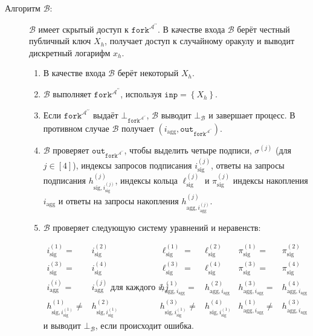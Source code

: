 \documentclass{mrl}
\theoremstyle{definition}
\numberwithin{theorem}{subsection}
\newcommand{\adversary}{\mathcal{A}}
\begin{document}
\begin{description}
\item [Алгоритм $\mathcal{B}$:] $\mathcal{B}$ имеет скрытый доступ к $\texttt{fork}^{\adversary^{\prime \prime}}$. В качестве входа $\mathcal{B}$ берёт честный публичный ключ $X_h$, получает доступ к случайному оракулу и выводит дискретный логарифм $x_h$.

\begin{enumerate}
\item В качестве входа $\mathcal{B}$ берёт некоторый $X_h$.

\item $\mathcal{B}$ выполняет $\texttt{fork}^{\adversary^{\prime \prime}}$, используя $\texttt{inp} = \left\{X_h\right\}$.

\item Если $\texttt{fork}^{\adversary^{\prime \prime}}$ выдаёт $\bot_{\texttt{fork}^{\adversary^{\prime \prime}}}$, $\mathcal{B}$ выводит $\bot_{\mathcal{B}}$ и завершает процесс. В противном случае $\mathcal{B}$ получает $(i_{\text{agg}}, \texttt{out}_{\texttt{fork}^{\adversary^{\prime \prime}}})$.

\item $\mathcal{B}$ проверяет $\texttt{out}_{\texttt{fork}^{\adversary^{\prime \prime}}}$, чтобы выделить четыре подписи, $\sigma^{(j)}$ (для $j \in [4]$), индексы запросов подписания $i_{\text{sig}}^{(j)}$, ответы на запросы подписания $h_{\text{sig}, i_{\text{sig}}^{(j)}}^{(j)}$, индексы кольца $\ell_{\text{sig}}^{(j)}$ и $\pi_{\text{sig}}^{(j)}$ индексы накопления $i_{\text{agg}}$ и ответы на запросы накопления $h_{\text{agg}, i_{\text{agg}}^{(j)}}^{(j)}$.

\item $\mathcal{B}$ проверяет следующую систему уравнений и неравенств:

\begin{align*}
i_{\text{sig}}^{(1)} =& i_{\text{sig}}^{(2)} & \ell_{\text{sig}}^{(1)} =& \ell_{\text{sig}}^{(2)} & \pi_{\text{sig}}^{(1)} =& \pi_{\text{sig}}^{(2)} \\ i_{\text{sig}}^{(3)} =& i_{\text{sig}}^{(4)} & \ell_{\text{sig}}^{(3)} =& \ell_{\text{sig}}^{(4)} & \pi_{\text{sig}}^{(3)} =& \pi_{\text{sig}}^{(4)} \\
i_{\text{agg}}^{(i)} =& i_{\text{agg}}^{(j)}\text{ для каждого }i, j &
h_{\text{agg}, i_{\text{agg}}}^{(1)} =& h_{\text{agg}, i_{\text{agg}}}^{(2)} &
h_{\text{agg}, i_{\text{agg}}}^{(3)} =& h_{\text{agg}, i_{\text{agg}}}^{(4)}\\
h_{\text{sig}, i_{\text{sig}}^{(1)}}^{(1)} \neq& h_{\text{sig}, i_{\text{sig}}^{(1)}}^{(2)} & h_{\text{sig}, i_{\text{sig}}^{(1)}}^{(3)} \neq& h_{\text{sig}, i_{\text{sig}}^{(1)}}^{(4)} & h_{\text{agg}, i_{\text{agg}}}^{(1)} \neq& h_{\text{agg}, i_{\text{agg}}}^{(3)}
\end{align*} и выводит $\bot_\mathcal{B}$, если происходит ошибка.


\end{enumerate}
\end{description}
\end{document}
